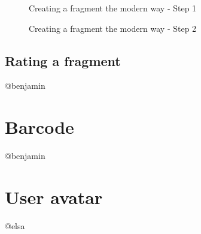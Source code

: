 \begin{figure}[!h]
  \centering
  \caption{Creating a fragment the modern way - Step 1}
  \label{fig:creating-fragment-modern-way-1}
\end{figure}

\begin{figure}[!h]
  \centering
  \caption{Creating a fragment the modern way - Step 2}
  \label{fig:creating-fragment-modern-way-2}
\end{figure}

\subsection{Rating a fragment}
@benjamin

\section{Barcode}
@benjamin

\section{User avatar}
@elsa

